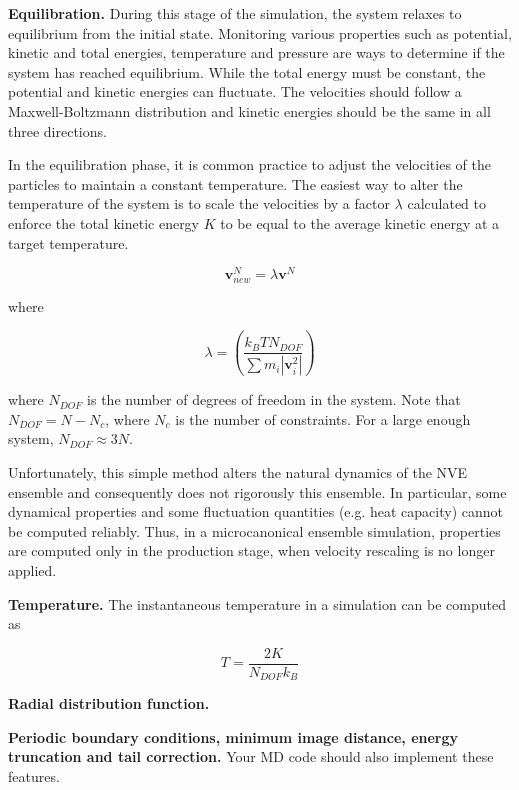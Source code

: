 \documentclass[aip,jcp,preprint,superscriptaddress,floatfix]{revtex4-1}
\begin{document}
\textbf{Equilibration. } During this stage of the simulation, the system relaxes to 
equilibrium from the initial state. Monitoring various properties such as potential,
 kinetic and total energies, temperature and pressure are ways to determine if the system has
reached equilibrium. While the total energy must be constant, the potential and kinetic energies
can fluctuate. The velocities should follow a Maxwell-Boltzmann distribution and kinetic
energies should be the same in all three directions. 

In the equilibration phase, it is common practice to adjust the velocities of 
the particles to maintain a constant temperature. The easiest way to alter the
temperature of the system is to scale the velocities by a factor $\lambda$
calculated to enforce
the total kinetic energy $K$ to be equal to the average kinetic energy at a target
temperature.

\begin{equation}
	\mathbf{v}^N_{new} = \lambda \mathbf{v}^N
\end{equation}

where 

\begin{equation}
	\lambda = \left( \frac{k_B T N_{DOF}}{\sum m_i | \mathbf{v}_i^2 |} \right)
\end{equation}

where $N_{DOF}$ is the number of degrees of freedom in the system. 
Note that $N_{DOF} = N - N_c$, where $N_c$ is the number of constraints. 
For a large enough system, $N_{DOF} \approx 3N$. 

Unfortunately, this simple method alters the natural dynamics of the NVE ensemble
and consequently does not rigorously this ensemble. In particular, some dynamical
properties and some fluctuation quantities (e.g. heat capacity) cannot
be computed reliably. Thus, in a microcanonical ensemble simulation, properties
are computed only in the production stage, when velocity rescaling is no longer
applied. 

\textbf{Temperature. } The instantaneous temperature in a simulation can be computed
as 

\begin{equation}
	T = \frac{2 K}{N_{DOF} k_B}
\end{equation}

\textbf{Radial distribution function. } 

\textbf{Periodic boundary conditions, minimum image distance, 
energy truncation and tail correction. } Your MD code should also implement 
these features.
\end{document}
